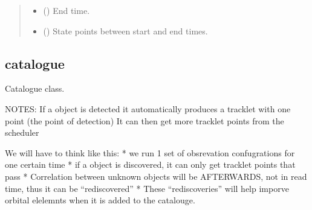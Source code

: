 \documentclass[letterpaper,10pt,english]{sphinxmanual}
\begin{document}
\begin{fulllineitems}
\begin{fulllineitems}
\begin{quote}
\begin{description}
\begin{itemize}
\item {} 
 () \textendash{} End time.

\item {} 
 () \textendash{} State points between start and end times.

\end{itemize}

\end{description}\end{quote}

\end{fulllineitems}


\end{fulllineitems}



\subsection{catalogue}
\label{\detokenize{modules/catalogue:module-catalogue}}\label{\detokenize{modules/catalogue:catalogue}}\label{\detokenize{modules/catalogue::doc}}
Catalogue class.

NOTES:
If a object is detected it automatically produces a tracklet with one point (the point of detection)
It can then get more tracklet points from the scheduler

We will have to think like this:
* we run 1 set of obsrevation confugrations for one certain time
* if a object is discovered, it can only get tracklet points that pass
* Correlation between unknown objects will be AFTERWARDS, not in read time, thus it can be “rediscovered”
* These “rediscoveries” will help imporve orbital elelemnts when it is added to the catalouge.
\end{document}
